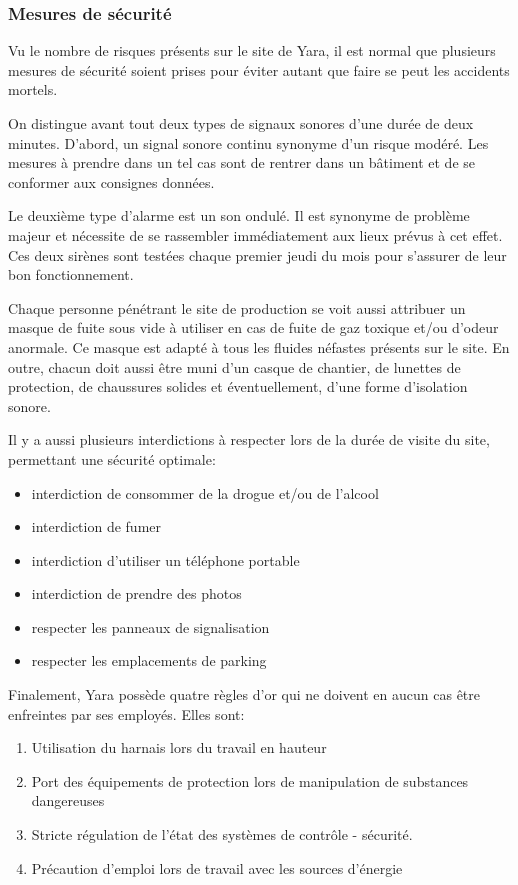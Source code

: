 	\subsubsection{Mesures de sécurité}
		Vu le nombre de risques présents sur le site de Yara, il est normal que plusieurs mesures de sécurité soient prises pour éviter autant que faire se peut les accidents mortels. 
		
		On distingue avant tout deux types de signaux sonores d'une durée de deux minutes. D'abord, un signal sonore continu synonyme d'un risque modéré. Les mesures à prendre dans un tel cas sont de rentrer dans un bâtiment et de se conformer aux consignes  données. 
		
		Le deuxième type d'alarme est un son ondulé. Il est synonyme de problème majeur et nécessite de se rassembler immédiatement aux lieux prévus à cet effet. Ces deux sirènes sont testées chaque premier jeudi du mois pour s'assurer de leur bon fonctionnement.
		
		Chaque personne pénétrant le site de production se voit aussi attribuer un masque de fuite sous vide à utiliser en cas de fuite de gaz toxique et/ou d'odeur anormale. Ce masque est adapté à tous les fluides néfastes présents sur le site. En outre, chacun doit aussi être muni d'un casque de chantier, de lunettes de protection, de chaussures solides et éventuellement, d'une forme d'isolation sonore.
		
		Il y a aussi plusieurs interdictions à respecter lors de la durée de visite du site, permettant une sécurité optimale:
			\begin{itemize}
			\item interdiction de consommer de la drogue et/ou de l'alcool
			\item interdiction de fumer
			\item interdiction d'utiliser un téléphone portable
			\item interdiction de prendre des photos
			\item respecter les panneaux de signalisation
			\item respecter les emplacements de parking
			\end{itemize}
		
		Finalement, Yara possède quatre règles d'or qui ne doivent en aucun cas être enfreintes par ses employés. Elles sont:
			\begin{enumerate}
			\item Utilisation du harnais lors du travail en hauteur
			\item Port des équipements de protection lors de manipulation de substances dangereuses
			\item Stricte régulation de l'état des systèmes de contrôle - sécurité.
			\item Précaution d'emploi lors de travail avec les sources d'énergie
			\end{enumerate}
		

